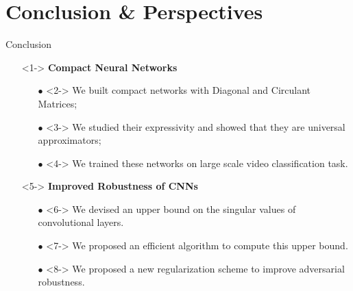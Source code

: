 \section{Conclusion \& Perspectives}


\begin{frame}{Conclusion}

  \begin{itemize}
    \item[\orangebold{1.}] <1-> \textbf{Compact Neural Networks}
    \small{
    \begin{itemize}
      \item[$\bullet$] <2-> We built compact networks with Diagonal and Circulant Matrices; 
      \item[$\bullet$] <3-> We studied their expressivity and showed that they are universal approximators;
      \item[$\bullet$] <4-> We trained these networks on large scale video classification task.
    \end{itemize}}
    \vspace{0.5cm}
    \item[\orangebold{2.}] <5-> \textbf{Improved Robustness of CNNs}
      \small{
      \begin{itemize}
        \item[$\bullet$] <6-> We devised an upper bound on the singular values of convolutional layers.
        \item[$\bullet$] <7-> We proposed an efficient algorithm to compute this upper bound.
        \item[$\bullet$] <8-> We proposed a new regularization scheme to improve adversarial robustness.
      \end{itemize}}
  \end{itemize}

\end{frame}


